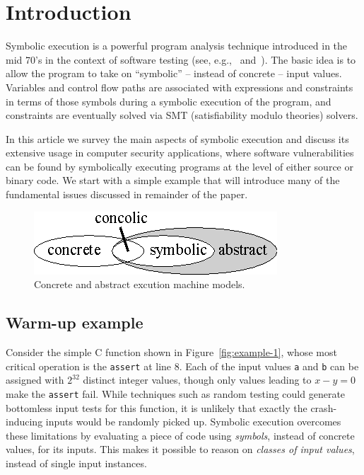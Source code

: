 
\section{Introduction}

Symbolic execution is a powerful program analysis technique introduced in the mid 70's in the context of software testing (see, e.g.,~{\cite{K-CACM76} and~\cite{H-TSE77}}). The basic idea is to allow the program to take on ``symbolic'' -- instead of concrete -- input values. Variables and control flow paths are associated with expressions and constraints in terms of those symbols during a symbolic execution of the program, and constraints are eventually solved via SMT (satisfiability modulo theories) solvers.

In this article we survey the main aspects of symbolic execution and discuss its extensive usage in computer security applications, where software vulnerabilities can be found by symbolically executing programs at the level of either source or binary code.
We start with a simple example that will introduce many of the fundamental issues discussed in remainder of the paper.

\begin{figure}[t]
\centering
\includegraphics[width=0.35\columnwidth]{images/concrete-abstract.eps} 
\caption{Concrete and abstract excution machine models.}
\label{fig:concrete-symbolic}
\end{figure}

\subsection{Warm-up example}
\label{symbolic-execution-example}

Consider the simple C function shown in Figure~\ref{fig:example-1}, whose most critical operation is the {\tt assert} at line 8. Each of the input values {\tt a} and {\tt b} can be assigned with $2^{32}$ distinct integer values, though only values leading to $x - y = 0$ make the {\tt assert} fail. While techniques such as random testing could generate bottomless input tests for this function, it is unlikely that exactly the crash-inducing inputs would be randomly picked up. 
Symbolic execution overcomes these limitations by evaluating a piece of code using {\em symbols}, instead of concrete values, for its inputs. This makes it possible to reason on {\em classes of input values}, instead of single input instances. 

